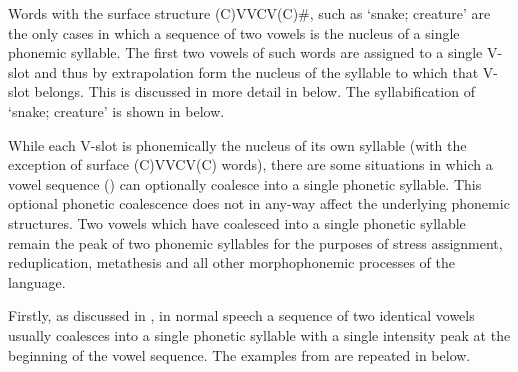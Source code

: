 Words with the surface structure (C)VVCV(C){\#}, such as  `snake; creature'
are the only cases in which a sequence of two vowels is the nucleus of a single phonemic syllable.
The first two vowels of such words are assigned to a single V-slot
and thus by extrapolation form the nucleus
of the syllable to which that V-slot belongs.
This is discussed in more detail in  below.
The syllabification of  `snake; creature' is shown in  below.

\begin{exe}
	\label{as:Syl:kaunaq}
\end{exe}

While each V-slot is phonemically the nucleus of its own syllable
(with the exception of surface (C)VVCV(C) words),
there are some situations in which a vowel sequence ()
can optionally coalesce into a single phonetic syllable.
This optional phonetic coalescence does not in any-way affect the underlying phonemic structures.
Two vowels which have coalesced into a single phonetic syllable
remain the peak of two phonemic syllables for the purposes of
stress assignment, reduplication, metathesis
and all other morphophonemic processes of the language.

Firstly, as discussed in ,
in normal speech a sequence of two identical vowels usually
coalesces into a single phonetic syllable with a single
intensity peak at the beginning of the vowel sequence.
The examples from 
are repeated in  below.

